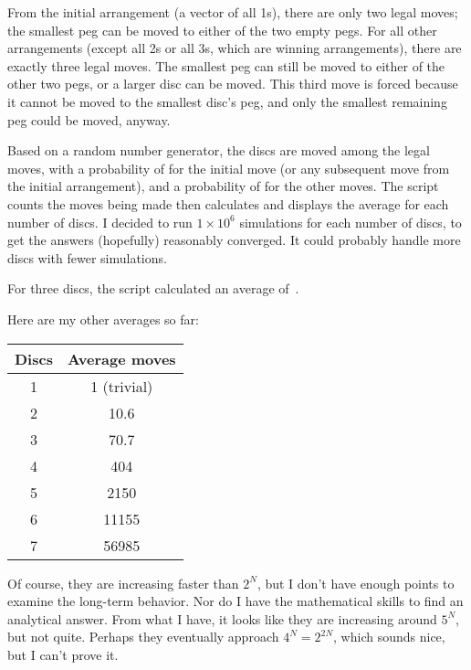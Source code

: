 \documentclass{article}
\begin{document}
From the initial arrangement (a vector of all 1s), there are only two legal moves; the smallest peg can be moved to either of the two empty pegs.
For all other arrangements (except all 2s or all 3s, which are winning arrangements), there are exactly three legal moves.
The smallest peg can still be moved to either of the other two pegs, or a larger disc can be moved.
This third move is forced because it cannot be moved to the smallest disc's peg, and only the smallest remaining peg could be moved, anyway.

Based on a random number generator, the discs are moved among the legal moves, with a probability of  for the initial move (or any subsequent move from the initial arrangement), and a probability of  for the other moves.
The script counts the moves being made then calculates and displays the average for each number of discs.
I decided to run $1\times10^{6}$ simulations for each number of discs, to get the answers (hopefully) reasonably converged.
It could probably handle more discs with fewer simulations.

For three discs, the script calculated an average of
\,.

Here are my other averages so far:

\begin{center}
\begin{tabular}{cc}
\textbf{Discs} & \textbf{Average moves} \\
\hline
1 & 1 (trivial) \\
2 & 10.6 \\
3 & 70.7 \\
4 & 404 \\
5 & 2150 \\
6 & 11155 \\
7 & 56985
\end{tabular}
\end{center}

Of course, they are increasing faster than $2^{N}$, but I don't have enough points to examine the long-term behavior.
Nor do I have the mathematical skills to find an analytical answer.
From what I have, it looks like they are increasing around $5^{N}$, but not quite.
Perhaps they eventually approach $4^{N}=2^{2N}$, which sounds nice, but I can't prove it.
\end{document}
